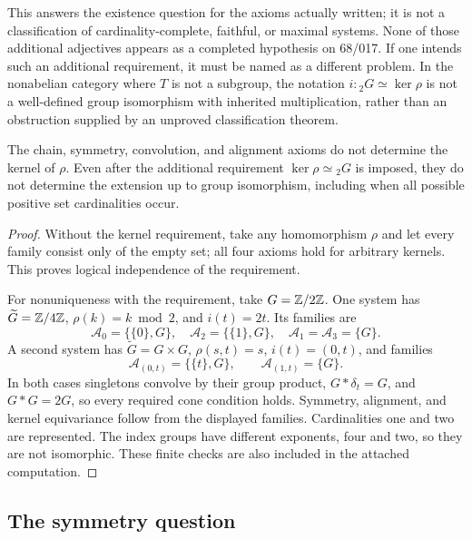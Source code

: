 This answers the existence question for the axioms actually written; it
is not a classification of cardinality-complete, faithful, or maximal
systems. None of those additional adjectives appears as a completed
hypothesis on 68/017. If one intends such an additional requirement, it
must be named as a different problem. In the nonabelian category where
$T$ is not a subgroup, the notation $i:{}_2G\simeq\ker\rho$ is not a
well-defined group isomorphism with inherited multiplication, rather than
an obstruction supplied by an unproved classification theorem.

\begin{proposition}\label{C-extension}
The chain, symmetry, convolution, and alignment axioms do not determine
the kernel of $\rho$. Even after the additional requirement
$\ker\rho\simeq{}_2G$ is imposed, they do not determine the extension up
to group isomorphism, including when all possible positive set cardinalities occur.
\end{proposition}
\begin{proof}
Without the kernel requirement, take any homomorphism $\rho$ and let
every family consist only of the empty set; all four axioms hold for
arbitrary kernels. This proves logical independence of the requirement.

For nonuniqueness with the requirement, take $G={\mathbb{Z}}/2{\mathbb{Z}}$. One system has
$\widetilde G={\mathbb{Z}}/4{\mathbb{Z}}$, $\rho(k)=k\bmod2$, and $i(t)=2t$.
Its families are
\[
 \mathcal A_0=\{\{0\},G\},\quad
 \mathcal A_2=\{\{1\},G\},\quad
 \mathcal A_1=\mathcal A_3=\{G\}.
\]
A second system has $\widetilde G=G\times G$, $\rho(s,t)=s$,
$i(t)=(0,t)$, and families
\[
 \mathcal A_{(0,t)}=\{\{t\},G\},\qquad
 \mathcal A_{(1,t)}=\{G\}.
\]
In both cases singletons convolve by their group product, $G*\delta_t=G$,
and $G*G=2G$, so every required cone condition holds. Symmetry, alignment,
and kernel equivariance follow from the displayed families. Cardinalities
one and two are represented. The index groups have different exponents,
four and two, so they are not isomorphic. These finite checks are also
included in the attached computation.
\end{proof}

\subsection{The symmetry question}


